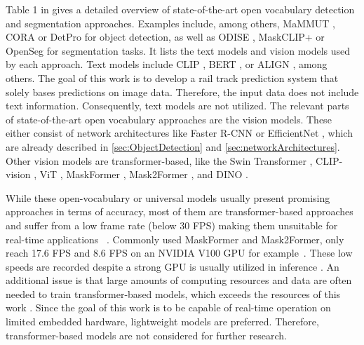 Table 1 in \cite{openvocabularysurvey2024} gives a detailed overview of state-of-the-art open vocabulary detection and segmentation approaches.
Examples include, among others, MaMMUT \cite{MaMMUT2023}, CORA \cite{CORA2023} or DetPro \cite{detPro2022} for object detection, as well as ODISE \cite{ODISE2023}, MaskCLIP+ \cite{MaskCLIP2022} or OpenSeg \cite{OpenSeg2022} for segmentation tasks.
It lists the text models and vision models used by each approach.
Text models include CLIP \cite{CLIP2021}, BERT \cite{BERT2019}, or ALIGN \cite{ALIGN2021}, among others.
The goal of this work is to develop a rail track prediction system that solely bases predictions on image data.
Therefore, the input data does not include text information.
Consequently, text models are not utilized.
The relevant parts of state-of-the-art open vocabulary approaches are the vision models.
These either consist of network architectures like Faster R-CNN or EfficientNet \cite{openvocabularysurvey2024}, which are already described in \autoref{sec:ObjectDetection} and \autoref{sec:networkArchitectures}.
Other vision models are transformer-based, like the Swin Transformer \cite{swinTransformer2021}, CLIP-vision \cite{CLIP2021}, ViT \cite{ViT2021}, MaskFormer \cite{MaskFormer2021}, Mask2Former \cite{mask2Former2022}, and DINO \cite{DINO2022}.

While these open-vocabulary or universal models usually present promising approaches in terms of accuracy, most of them are transformer-based approaches and suffer from a low frame rate (below 30 FPS) making them unsuitable for real-time applications \cite{carion2020endtoendobjectdetectiontransformers} \cite{groundingdino2024} \cite{swinTransformer2021} \cite{MaskFormer2021} \cite{mask2Former2022}~\cite{glipv22022}.
Commonly used MaskFormer and Mask2Former, only reach 17.6 FPS and 8.6 FPS on an NVIDIA V100 GPU for example~\cite{mask2Former2022}.
These low speeds are recorded despite a strong GPU is usually utilized in inference \cite{groundingdino2024} \cite{glipv22022}.
An additional issue is that large amounts of computing resources and data are often needed to train transformer-based models, which exceeds the resources of this work \cite{groundingdino2024} \cite{glipv22022} \cite{segmentAnything2023} \cite{segmentAnything22024}.
Since the goal of this work is to be capable of real-time operation on limited embedded hardware, lightweight models are preferred.
Therefore, transformer-based models are not considered for further research.